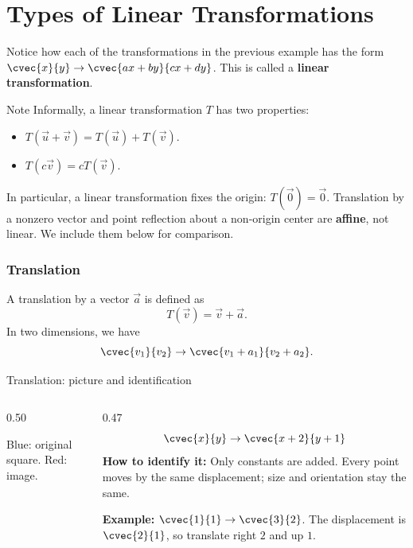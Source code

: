 \section[Transformation]{Types of Linear Transformations}
\frame{\sectionpage}

\begin{frame}
Notice how each of the transformations in the previous example has the form $\cvec{x}{y} \to \cvec{ax+by}{cx+dy}$. This is called a \textbf{linear transformation}.
\begin{remark}{Note}
Informally, a linear transformation $T$ has two properties:
\begin{itemize}
\item $T(\vec{u}+\vec{v}) = T(\vec{u}) + T(\vec{v})$.
\item $T(c\vec{v}) = cT(\vec{v})$.
\end{itemize}
In particular, a linear transformation fixes the origin: $T(\vec{0})=\vec{0}$. Translation by a nonzero vector and point reflection about a non-origin center are \textbf{affine}, not linear. We include them below for comparison.
\end{remark}
\end{frame}


\begin{frame}
\frametitle{Translation}
\begin{defn}{}{}
A translation by a vector $\vec{a}$ is defined as
\[ T(\vec{v}) = \vec{v} + \vec{a}.\]
In two dimensions, we have
\[ \cvec{v_1}{v_2} \to \cvec{v_1+a_1}{v_2+a_2}.\]
\end{defn}
\end{frame}

\begin{frame}{Translation: picture and identification}
\begin{columns}[T]
\begin{column}{0.50\textwidth}
\centering
{}

\small Blue: original square. Red: image.
\end{column}
\begin{column}{0.47\textwidth}
\small
\[ \cvec{x}{y}\to\cvec{x+2}{y+1} \]
\textbf{How to identify it:} Only constants are added. Every point moves by the same displacement; size and orientation stay the same.

\medskip
\textbf{Example:} $\cvec{1}{1}\to\cvec{3}{2}$. The displacement is $\cvec{2}{1}$, so translate right $2$ and up $1$.
\end{column}
\end{columns}
\end{frame}



